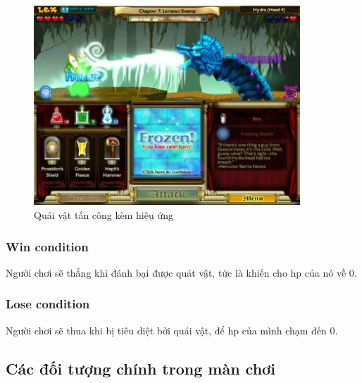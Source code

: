 \begin{itemize}
\begin{itemize}
		\begin{figure}[H]
			\centering
			\includegraphics[width=10cm]{Images/MonsterAttack2.png}
			\vspace{0.5cm}
			\caption{Quái vật tấn công kèm hiệu ứng}
		\end{figure}
		
	\end{itemize}
\end{itemize}
\subsubsection{Win condition}
Người chơi sẽ thắng khi đánh bại được quát vật, tức là khiến cho hp của nó về 0.
\subsubsection{Lose condition}
Người chơi sẽ thua khi bị tiêu diệt bởi quái vật, để hp của mình chạm đến 0.
\subsection{Các đối tượng chính trong màn chơi}